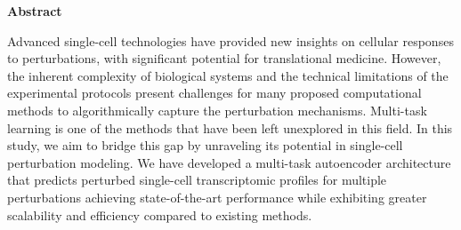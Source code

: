 \documentclass[12pt, a4paper]{article}
\begin{document}








{
\renewcommand*\contentsname{Contents}
\hypersetup{linkcolor=black}
\tableofcontents
}

\thispagestyle{empty}

\clearpage
{}
\listoffigures

\clearpage
{}
\listoftables

\clearpage
{}

\printglossary[type=\acronymtype, title=Acronyms]

\clearpage
{}
\begin{center}
\textbf{\Large Abstract}
\end{center}

Advanced single-cell technologies have provided new insights on cellular responses to perturbations, with significant potential for translational medicine. However, the inherent complexity of biological systems and the technical limitations of the experimental protocols present challenges for many proposed computational methods to algorithmically capture the perturbation mechanisms. Multi-task learning is one of the methods that have been left unexplored in this field. In this study, we aim to bridge this gap by unraveling its potential in single-cell perturbation modeling. We have developed a multi-task autoencoder architecture that predicts perturbed single-cell transcriptomic profiles for multiple perturbations achieving state-of-the-art performance while exhibiting greater scalability and efficiency compared to existing methods.

\clearpage


\end{document}
